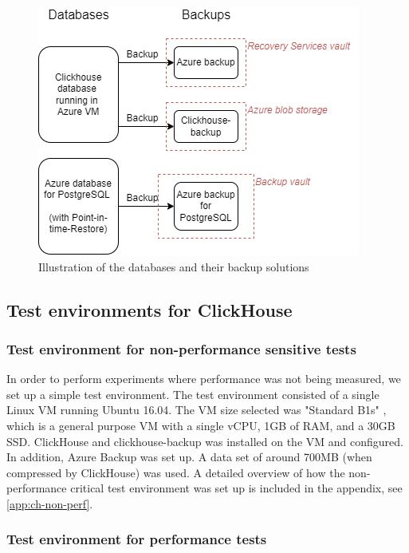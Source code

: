 \begin{figure}[h!]
    \centering
    \includegraphics[width=.9\linewidth]{figures/Backupsolution.png}
    \caption{Illustration of the databases and their backup solutions}
    \label{fig:backup_architecture}
\end{figure}

\subsection{Test environments for ClickHouse}
\subsubsection{Test environment for non-performance sensitive tests} \label{method:ch-non-perf}
In order to perform experiments where performance was not being measured,
we set up a simple test environment.
The test environment consisted of a single Linux VM running Ubuntu 16.04.
The VM size selected was "Standard B1s" \cite{rishabv90_b-series_nodate}, which is a general purpose VM with
a single vCPU, 1GB of RAM, and a 30GB SSD. 
ClickHouse and clickhouse-backup was installed on the VM and configured. In addition, Azure Backup was set up. A data set of around 700MB (when compressed by ClickHouse) was used. A detailed overview of how the non-performance critical test environment was set up is included in the appendix, see \ref{app:ch-non-perf}.

\subsubsection{Test environment for performance tests}

